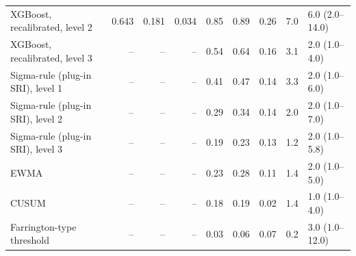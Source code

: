 \begin{minipage}{\linewidth}
\begin{tabular}{lrrrrrrrl}
XGBoost, recalibrated, level 2 & 0.643 & 0.181 & 0.034 & 0.85 & 0.89 & 0.26 & 7.0 & 6.0 (2.0--14.0) \\
XGBoost, recalibrated, level 3 & -- & -- & -- & 0.54 & 0.64 & 0.16 & 3.1 & 2.0 (1.0--4.0) \\
Sigma-rule (plug-in SRI), level 1 & -- & -- & -- & 0.41 & 0.47 & 0.14 & 3.3 & 2.0 (1.0--6.0) \\
Sigma-rule (plug-in SRI), level 2 & -- & -- & -- & 0.29 & 0.34 & 0.14 & 2.0 & 2.0 (1.0--7.0) \\
Sigma-rule (plug-in SRI), level 3 & -- & -- & -- & 0.19 & 0.23 & 0.13 & 1.2 & 2.0 (1.0--5.8) \\
EWMA & -- & -- & -- & 0.23 & 0.28 & 0.11 & 1.4 & 2.0 (1.0--5.0) \\
CUSUM & -- & -- & -- & 0.18 & 0.19 & 0.02 & 1.4 & 1.0 (1.0--4.0) \\
Farrington-type threshold & -- & -- & -- & 0.03 & 0.06 & 0.07 & 0.2 & 3.0 (1.0--12.0) \\
\bottomrule
\end{tabular}
\end{minipage}
\vspace{14pt}

